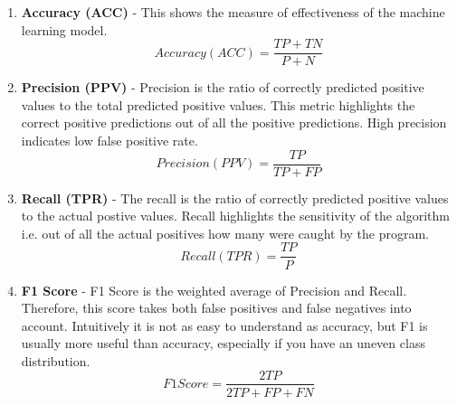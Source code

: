 \begin{enumerate}
    \item \textbf{Accuracy (ACC)} - This shows the measure of effectiveness of the machine learning model.
    \begin{equation} 
     Accuracy (ACC)= \frac{TP + TN}{P + N}
    \end{equation}
    \item \textbf{Precision (PPV)} - Precision is the ratio of correctly predicted positive values to the total predicted positive values. This metric highlights the correct positive predictions out of all the positive predictions. High precision indicates low false positive rate.
    \begin{equation} 
     Precision (PPV)= \frac{TP}{TP + FP}
    \end{equation}
    \item \textbf{Recall (TPR)} - The recall is the ratio of correctly predicted positive values to the actual postive values. Recall highlights the sensitivity of the algorithm i.e. out of all the actual positives how many were caught by the program.
    \begin{equation} 
     Recall (TPR)= \frac{TP}{P}
    \end{equation}
    
    \item \textbf{F1 Score} - F1 Score is the weighted average of Precision and Recall. Therefore, this score takes both false positives and false negatives into account. Intuitively it is not as easy to understand as accuracy, but F1 is usually more useful than accuracy, especially if you have an uneven class distribution.
    \begin{equation} 
     F1 Score = \frac{2TP}{2TP + FP + FN}
    \end{equation}
\end{enumerate}
